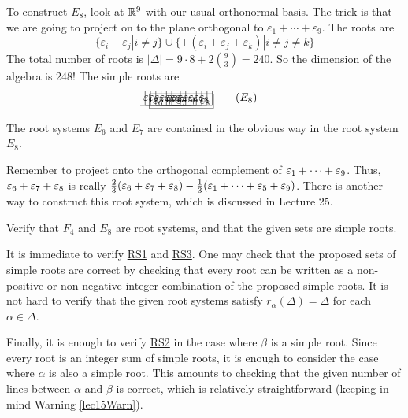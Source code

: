  To construct $E_8$, look at $\mathbb{R}^9$ with our
 usual orthonormal basis. The trick is that we are going to project on to the plane
 orthogonal to $\varepsilon_1+\cdots + \varepsilon_9$. The roots are
 \[
    \{\varepsilon_i - \varepsilon_j| i\neq j\} \cup \{\pm (\varepsilon_i+\varepsilon_j + \varepsilon_k)| i\neq j\neq k\}
 \]
 The total number of roots is $|\Delta| = 9\cdot 8 + 2\binom{9}{3} = 240$. So the
 dimension of the algebra is 248! The simple roots are
 \[\hspace*{-1em}\begin{xy}
   (0,0) *{\varepsilon_1 - \varepsilon_2} *+\frm{-};
   p+(1.7,0) *{\varepsilon_2 - \varepsilon_3} *+\frm{-} **@{-};
   p+(1.7,0) *{\varepsilon_3 - \varepsilon_4} *+\frm{-} **@{-};
   p+(1.7,0) *{\varepsilon_4 - \varepsilon_5} *+\frm{-} **@{-};
   p+(1.7,0) *{\varepsilon_5 - \varepsilon_6} *+\frm{-} **@{-};
   p+(0,-1) *{\varepsilon_6 + \varepsilon_7 + \varepsilon_8} *+\frm{-} **@{-},
   p+(1.7,0) *{\varepsilon_6 - \varepsilon_7} *+\frm{-} **@{-};
   p+(1.7,0) *{\varepsilon_7 - \varepsilon_8} *+\frm{-} **@{-};
 \end{xy}\tag{$E_8$}\]

 The root systems $E_6$ and $E_7$ are contained in the obvious way in the root system
 $E_8$.
 \begin{warning}\label{lec15Warn}
   Remember to project onto the orthogonal complement of $\varepsilon_1+\cdots+\varepsilon_9$. Thus,
   $\varepsilon_6+\varepsilon_7+\varepsilon_8$ is really $\frac{2}{3}(\varepsilon_6+\varepsilon_7+\varepsilon_8) -
   \frac{1}{3}(\varepsilon_1+\cdots+\varepsilon_5 + \varepsilon_9)$. There is another way to construct this root
   system, which is discussed in Lecture 25.
 \end{warning}
 \begin{exercise}
   Verify that $F_4$ and $E_8$ are root systems, and that the given sets are simple
   roots.
   \begin{solution}
     It is immediate to verify \hyperlink{RS1}{RS1} and \hyperlink{RS3}{RS3}. One may
     check that the proposed sets of simple roots are correct by checking that every
     root can be written as a non-positive or non-negative integer combination of the
     proposed simple roots. It is not hard to verify that the given root systems
     satisfy $r_\alpha(\Delta)=\Delta$ for each $\alpha\in \Delta$.

     Finally, it is enough to verify \hyperlink{RS2}{RS2} in the case where $\beta$ is
     a simple root. Since every root is an integer sum of simple roots, it is enough
     to consider the case where $\alpha$ is also a simple root. This amounts to
     checking that the given number of lines between $\alpha$ and $\beta$ is correct,
     which is relatively straightforward (keeping in mind Warning \ref{lec15Warn}).
   \end{solution}
 \end{exercise}

